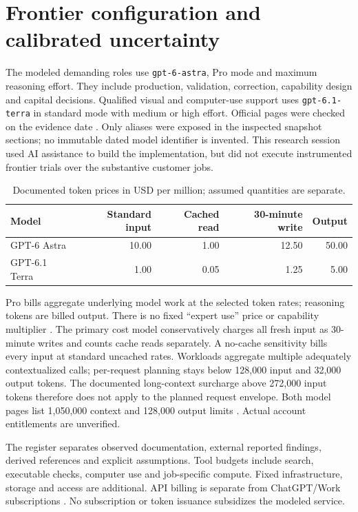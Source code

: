 \documentclass[11pt,letterpaper]{article}
\begin{document}
\section{Frontier configuration and calibrated uncertainty}

The modeled demanding roles use \texttt{gpt-6-astra}, Pro mode and maximum
reasoning effort. They include production, validation, correction, capability
design and capital decisions. Qualified visual and computer-use support uses
\texttt{gpt-6.1-terra} in standard mode with medium or high effort. Official pages
were checked on the evidence date \citep{oai-astra,oai-terra,oai-latest,oai-reasoning,oai-terra-release}.
Only aliases were exposed in the inspected snapshot sections; no immutable dated
model identifier is invented. This research session used AI assistance to build
the implementation, but did not execute instrumented frontier trials over the
substantive customer jobs.

\begin{table}[H]\centering\small
\caption{Documented token prices in USD per million; assumed quantities are separate.}
\begin{tabular}{lrrrr}\toprule
Model & Standard input & Cached read & 30-minute write & Output\\\midrule
GPT-6 Astra & 10.00 & 1.00 & 12.50 & 50.00\\
GPT-6.1 Terra & 1.00 & 0.05 & 1.25 & 5.00\\\bottomrule
\end{tabular}
\end{table}

Pro bills aggregate underlying model work at the selected token rates; reasoning
tokens are billed output. There is no fixed ``expert use'' price or capability
multiplier \citep{oai-reasoning,oai-pricing}. The primary cost model conservatively
charges all fresh input as 30-minute writes and counts cache reads separately.
A no-cache sensitivity bills every input at standard uncached rates. Workloads
aggregate multiple adequately contextualized calls; per-request planning stays
below 128,000 input and 32,000 output tokens. The documented long-context
surcharge above 272,000 input tokens therefore does not apply to the planned
request envelope. Both model pages list 1,050,000 context and 128,000 output
limits \citep{oai-astra,oai-terra}. Actual account entitlements are unverified.

The register separates observed documentation, external reported findings,
derived references and explicit assumptions. Tool budgets include search,
executable checks, computer use and job-specific compute. Fixed infrastructure,
storage and access are additional. API billing is separate from ChatGPT/Work
subscriptions \citep{oai-work}. No subscription or token issuance subsidizes the
modeled service.
\end{document}
